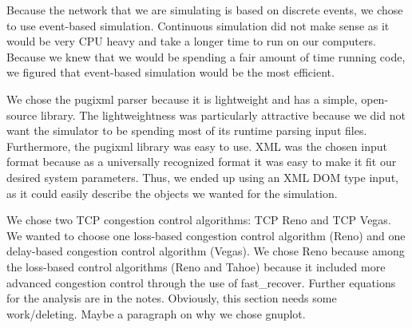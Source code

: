 \documentclass{article}
\begin{document}
    Because the network that we are simulating is based on discrete events, we chose to use event-based simulation. Continuous simulation did not make sense as it would be very CPU heavy and take a longer time to run on our computers. Because we knew that we would be spending a fair amount of time running code, we figured that event-based simulation would be the most efficient.

    We chose the pugixml parser because it is lightweight and has a simple, open-source library. The lightweightness was particularly attractive because we did not want the simulator to be spending most of its runtime parsing input files. Furthermore, the pugixml library was easy to use. XML was the chosen input format because as a universally recognized format it was easy to make it fit our desired system parameters. Thus, we ended up using an XML DOM type input, as it could easily describe the objects we wanted for the simulation.

    We chose two TCP congestion control algorithms: TCP Reno and TCP Vegas. We wanted to choose one loss-based congestion control algorithm (Reno) and one delay-based congestion control algorithm (Vegas). We chose Reno because among the loss-based control algorithms (Reno and Tahoe) because it included more advanced congestion control through the use of fast\_recover. Further equations for the analysis are in the notes. Obviously, this section needs some work/deleting.
    Maybe a paragraph on why we chose gnuplot.
\end{document}
